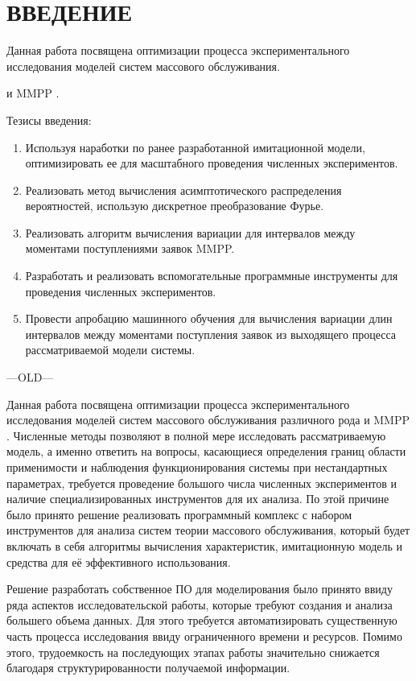 \section*{ВВЕДЕНИЕ}


Данная работа посвящена оптимизации процесса экспериментального исследования моделей систем массового обслуживания.

 \cite{phung2019retrial} и MMPP \cite{baiocchi1993steady,2019asymptotic,meier1987fitting}.


\cite{задорожный2011методы}


Тезисы введения:
\begin{enumerate}
	\item Используя наработки по ранее разработанной имитационной модели, оптимизировать ее для масштабного проведения численных экспериментов.
	\item Реализовать метод вычисления асимптотического распределения вероятностей, использую дискретное преобразование Фурье. 
	\item Реализовать алгоритм вычисления вариации для интервалов между моментами поступлениями заявок MMPP.
	\item Разработать и реализовать вспомогательные программные инструменты для проведения численных экспериментов.
	\item Провести апробацию машинного обучения для вычисления вариации длин интервалов между моментами поступления заявок из выходящего процесса рассматриваемой модели системы.
\end{enumerate}


---OLD---

Данная работа посвящена оптимизации процесса экспериментального исследования моделей систем массового обслуживания различного рода \cite{phung2019retrial} и MMPP \cite{baiocchi1993steady,2019asymptotic,meier1987fitting}. Численные методы позволяют в полной мере исследовать рассматриваемую модель, а именно ответить на вопросы, касающиеся определения границ области применимости и наблюдения функционирования системы при нестандартных параметрах, требуется проведение большого числа численных экспериментов и наличие специализированных инструментов для их анализа. По этой причине было принято решение реализовать программный комплекс с набором инструментов для анализа систем теории массового обслуживания, который будет включать в себя алгоритмы вычисления характеристик, имитационную модель и средства для её эффективного использования.

Решение разработать собственное ПО для моделирования было принято ввиду ряда аспектов исследовательской работы, которые требуют создания и анализа большего объема данных. Для этого требуется автоматизировать существенную часть процесса исследования ввиду ограниченного времени и ресурсов. Помимо этого, трудоемкость на последующих этапах работы значительно снижается благодаря структурированности получаемой информации.

